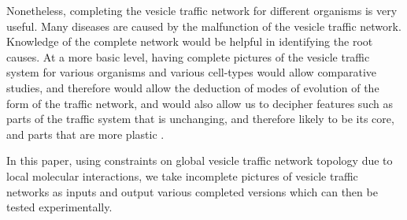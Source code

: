 Nonetheless, completing the vesicle traffic network for different organisms is very useful. Many diseases are caused by the malfunction of the vesicle traffic network. Knowledge of the complete network would be helpful in identifying the root causes\cite{bexiga2013human,gissen2007cargos}. At a more basic level, having complete pictures of the vesicle traffic system for various organisms and various cell-types would allow comparative studies, and therefore would allow the deduction of modes of evolution of the form of the traffic network, and would also allow us to decipher features such as parts of the traffic system that is unchanging, and therefore likely to be its core, and parts that are more plastic \cite{barlow2017seeing}.

In this paper, using constraints on global vesicle traffic network topology due to local molecular interactions, we take incomplete pictures of vesicle traffic networks as inputs and output various completed versions which can then be tested experimentally.
%



